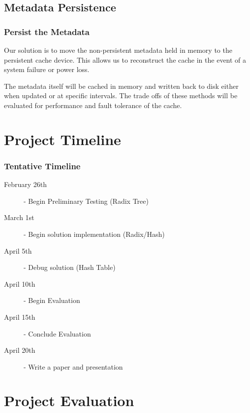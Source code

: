 \documentclass{beamer}
\begin{document}
\subsection{Metadata Persistence}

\begin{frame}
  \frametitle{Persist the Metadata}

  Our solution is to move the non-persistent metadata held in memory
  to the persistent cache device. This allows us to reconstruct the
  cache in the event of a system failure or power loss.

  The metadata itself will be cached in memory and written back to
  disk either when updated or at specific intervals. The trade offs of
  these methods will be evaluated for performance and fault tolerance
  of the cache.

\end{frame}



\section{Project Timeline}

\begin{frame}
  \frametitle{Tentative Timeline}
  \begin{description}
    \item[February 26th] - Begin Preliminary Testing (Radix Tree)
    \item[March 1st] - Begin solution implementation (Radix/Hash)
    \item[April 5th] - Debug solution (Hash Table)
    \item[April 10th] - Begin Evaluation
    \item[April 15th] - Conclude Evaluation
    \item[April 20th] - Write a paper and presentation
  \end{description}
\end{frame}


\section{Project Evaluation}
\end{document}
